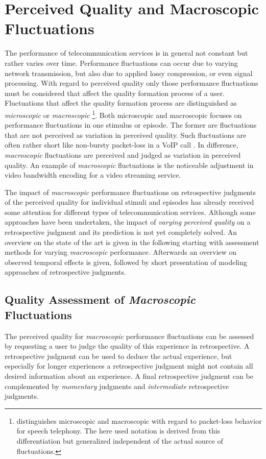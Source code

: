 \section{Perceived Quality and Macroscopic Fluctuations}\label{chap:04}
The performance of telecommunication services is in general not constant but rather varies over time.
Performance fluctuations can occur due to varying network transmission, but also due to applied lossy compression, or even signal processing.
With regard to perceived quality only those performance fluctuations must be considered that affect the quality formation process of a user.
Fluctuations that affect the quality formation process are distinguished as \emph{microscopic} or \emph{macroscopic} \citep[\cf,][p. 72]{raake_short-_2006}
\footnote{\citet{raake_short-_2006} distinguishes microscopic and macroscopic with regard to packet-loss behavior for speech telephony. The here used notation is derived from this differentiation but generalized independent of the actual source of fluctuations.}.
Both microscopic and macroscopic focuses on performance fluctuations in one stimulus or episode.
The former are fluctuations that are not perceived as variation in perceived quality.
Such fluctuations are often rather short like non-bursty packet-loss in a \ac{VoIP} call \citep[\cf,][p. 72]{raake_short-_2006}.
In difference, \emph{macroscopic} fluctuations are perceived and judged as variation in perceived quality.
An example of \emph{macroscopic} fluctuations is the noticeable adjustment in video bandwidth encoding for a video streaming service.

The impact of \emph{macroscopic} performance fluctuations on retrospective judgments of the perceived quality for individual stimuli and episodes has already received some attention for different types of telecommunication services.
Although some approaches have been undertaken, the impact of \emph{varying perceived quality} on a retrospective judgment and its prediction is not yet completely solved.
An overview on the state of the art is given in the following starting with assessment methods for varying \emph{macroscopic} performance.
Afterwards an overview on observed temporal effects is given, followed by short presentation of modeling approaches of retrospective judgments.

\subsection{Quality Assessment of \emph{Macroscopic} Fluctuations}
The perceived quality for \emph{macroscopic} performance fluctuations can be assessed by requesting a user to judge the quality of this experience in retrospective.
A retrospective judgment can be used to deduce the actual experience, but especially for longer experiences a retrospective judgment might not contain all desired information about an experience.
A final retrospective judgment can be complemented by \emph{momentary} judgments and \emph{intermediate} retrospective judgments.

